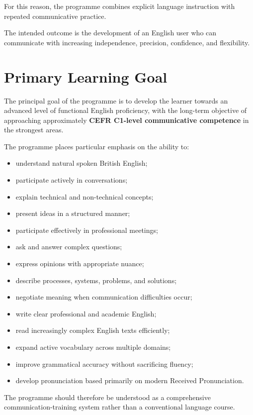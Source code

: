 For this reason, the programme combines explicit language instruction with repeated communicative practice.

The intended outcome is the development of an English user who can communicate with increasing independence, precision, confidence, and flexibility.

\section*{Primary Learning Goal}

The principal goal of the programme is to develop the learner towards an advanced level of functional English proficiency, with the long-term objective of approaching approximately \textbf{CEFR C1-level communicative competence} in the strongest areas.

The programme places particular emphasis on the ability to:

\begin{itemize}
    \item understand natural spoken British English;
    \item participate actively in conversations;
    \item explain technical and non-technical concepts;
    \item present ideas in a structured manner;
    \item participate effectively in professional meetings;
    \item ask and answer complex questions;
    \item express opinions with appropriate nuance;
    \item describe processes, systems, problems, and solutions;
    \item negotiate meaning when communication difficulties occur;
    \item write clear professional and academic English;
    \item read increasingly complex English texts efficiently;
    \item expand active vocabulary across multiple domains;
    \item improve grammatical accuracy without sacrificing fluency;
    \item develop pronunciation based primarily on modern Received Pronunciation.
\end{itemize}

The programme should therefore be understood as a comprehensive communication-training system rather than a conventional language course.

